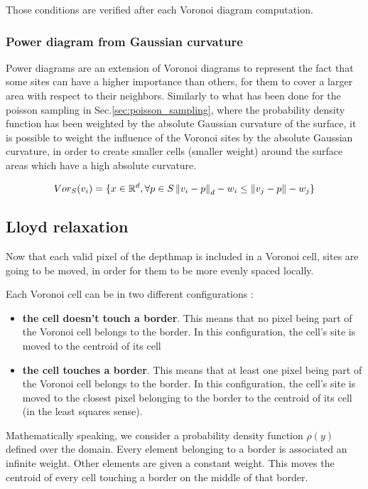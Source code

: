 \documentclass[11pt,fleqn]{book} %
\begin{document}
Those conditions are verified after each Voronoi diagram computation. 

\subsubsection{Power diagram from Gaussian curvature}
Power diagrams are an extension of Voronoi diagrams to represent the fact that some sites can have a higher importance than others, for them to cover a larger area with respect to their neighbors. Similarly to what has been done for the poisson sampling in Sec.\ref{sec:poisson_sampling}, where the probability density function has been weighted by the absolute Gaussian curvature of the surface, it is possible to weight the influence of the Voronoi sites by the absolute Gaussian curvature, in order to create smaller cells (smaller weight) around the surface areas which have a high absolute curvature.

\begin{equation}
\label{eq:power_cell}
	Vor_S(v_i) = \{ x \in \mathbb{R}^d, \forall p \in S \left\lVert v_i-p\right\rVert_d - w_i \leq \left\lVert v_j-p\right\rVert - w_j\}
\end{equation}

\subsection{Lloyd relaxation}
Now that each valid pixel of the depthmap is included in a Voronoi cell, sites are going to be moved, in order for them to be more evenly spaced locally.

Each Voronoi cell can be in two different configurations : 
\begin{itemize}
	\item \textbf{the cell doesn't touch a border}. This means that no pixel being part of the Voronoi cell belongs to the border.
	In this configuration, the cell's site is moved to the centroid of its cell
	\item \textbf{the cell touches a border}. This means that at least one pixel being part of the Voronoi cell belongs to the border.
	In this configuration, the cell's site is moved to the closest pixel belonging to the border to the centroid of its cell (in the least squares sense).
\end{itemize}

Mathematically speaking, we consider a probability density function $\rho(y)$ defined over the domain. 
Every element belonging to a border is associated an infinite weight. Other elements are given a constant weight.
This moves the centroid of every cell touching a border on the middle of that border.
\end{document}
